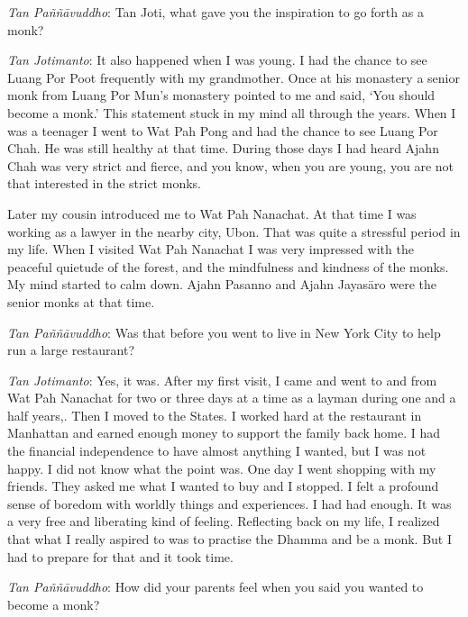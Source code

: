 \emph{Tan Paññāvuddho}‎: Tan Joti, what gave you the inspiration to go
forth as a monk?

\emph{Tan Jotimanto}: It also happened when I was young. I had the
chance to see Luang Por Poot frequently with my grandmother. Once at his
monastery a senior monk from Luang Por Mun's monastery pointed to me and
said, `You should become a monk.' This statement stuck in my mind all
through the years. When I was a teenager I went to Wat Pah Pong and had
the chance to see Luang Por Chah. He was still healthy at that time.
During those days I had heard Ajahn Chah was very strict and fierce, and
you know, when you are young, you are not that interested in the strict
monks.

Later my cousin introduced me to Wat Pah Nanachat. At that time I was
working as a lawyer in the nearby city, Ubon. That was quite a stressful
period in my life. When I visited Wat Pah Nanachat I was very impressed
with the peaceful quietude of the forest, and the mindfulness and
kindness of the monks. My mind started to calm down. Ajahn Pasanno and
Ajahn Jayasāro were the senior monks at that time.

\emph{Tan Paññāvuddho}‎: Was that before you went to live in New York
City to help run a large restaurant?

\emph{Tan Jotimanto}: Yes, it was. After my first visit, I came and went
to and from Wat Pah Nanachat for two or three days at a time as a layman
during one and a half years,. Then I moved to the States. I worked hard
at the restaurant in Manhattan and earned enough money to support the
family back home. I had the financial independence to have almost
anything I wanted, but I was not happy. I did not know what the point
was. One day I went shopping with my friends. They asked me what I
wanted to buy and I stopped. I felt a profound sense of boredom with
worldly things and experiences. I had had enough. It was a very free and
liberating kind of feeling. Reflecting back on my life, I realized that
what I really aspired to was to practise the Dhamma and be a monk. But I
had to prepare for that and it took time.

\emph{Tan Paññāvuddho}‎: How did your parents feel when you said you
wanted to become a monk?

